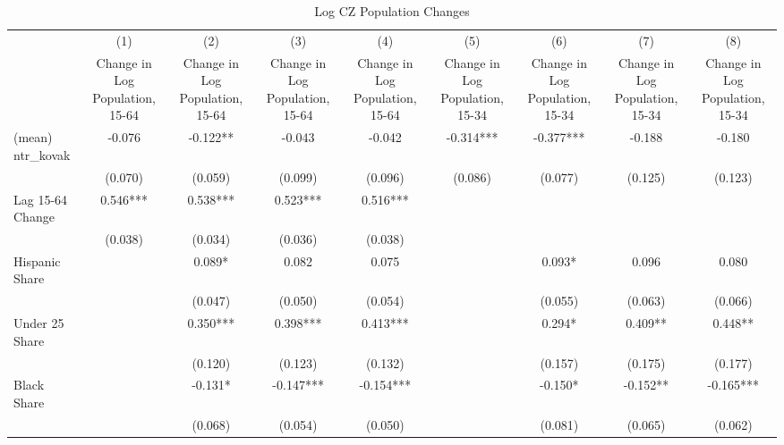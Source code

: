 \begin{table}[htbp]\centering
\def\sym#1{\ifmmode^{#1}\else\(^{#1}\)\fi}
\caption{Log CZ Population Changes}
\begin{tabular}{l*{8}{c}}
\toprule
                    &\multicolumn{1}{c}{(1)}&\multicolumn{1}{c}{(2)}&\multicolumn{1}{c}{(3)}&\multicolumn{1}{c}{(4)}&\multicolumn{1}{c}{(5)}&\multicolumn{1}{c}{(6)}&\multicolumn{1}{c}{(7)}&\multicolumn{1}{c}{(8)}\\
                    &\multicolumn{1}{c}{Change in Log Population, 15-64}&\multicolumn{1}{c}{Change in Log Population, 15-64}&\multicolumn{1}{c}{Change in Log Population, 15-64}&\multicolumn{1}{c}{Change in Log Population, 15-64}&\multicolumn{1}{c}{Change in Log Population, 15-34}&\multicolumn{1}{c}{Change in Log Population, 15-34}&\multicolumn{1}{c}{Change in Log Population, 15-34}&\multicolumn{1}{c}{Change in Log Population, 15-34}\\
\midrule
(mean) ntr\_kovak    &   -0.076   &   -0.122** &   -0.043   &   -0.042   &   -0.314***&   -0.377***&   -0.188   &   -0.180   \\
                    &  (0.070)   &  (0.059)   &  (0.099)   &  (0.096)   &  (0.086)   &  (0.077)   &  (0.125)   &  (0.123)   \\
\addlinespace
Lag 15-64 Change    &    0.546***&    0.538***&    0.523***&    0.516***&            &            &            &            \\
                    &  (0.038)   &  (0.034)   &  (0.036)   &  (0.038)   &            &            &            &            \\
\addlinespace
Hispanic Share      &            &    0.089*  &    0.082   &    0.075   &            &    0.093*  &    0.096   &    0.080   \\
                    &            &  (0.047)   &  (0.050)   &  (0.054)   &            &  (0.055)   &  (0.063)   &  (0.066)   \\
\addlinespace
Under 25 Share      &            &    0.350***&    0.398***&    0.413***&            &    0.294*  &    0.409** &    0.448** \\
                    &            &  (0.120)   &  (0.123)   &  (0.132)   &            &  (0.157)   &  (0.175)   &  (0.177)   \\
\addlinespace
Black Share         &            &   -0.131*  &   -0.147***&   -0.154***&            &   -0.150*  &   -0.152** &   -0.165***\\
                    &            &  (0.068)   &  (0.054)   &  (0.050)   &            &  (0.081)   &  (0.065)   &  (0.062)   \\

\end{tabular}
\end{table}
